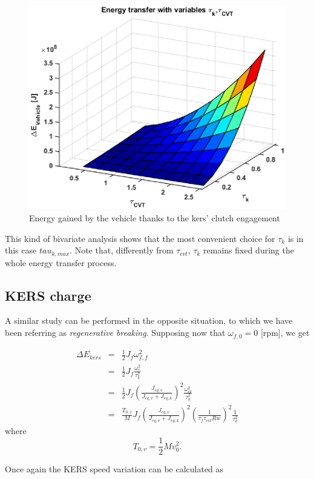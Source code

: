 \documentclass[11pt]{article}
\begin{document}
\begin{figure}[H]
\captionsetup{font=small, justification=centering}
\centering
\includegraphics[width=.55\textwidth]{Images/Results_new/Univariate_SteadyState/en_comp_acc_3D.eps}
\caption{Energy gained by the vehicle thanks to the kers' clutch engagement}
\label{en_comp_acc_3D}
\end{figure}    

This kind of bivariate analysis shows that the most convenient choice for $\tau_k$ is in this case $tau_{k,max}$. Note that, differently from $\tau_{cvt}$, $\tau_k$ remains fixed during the whole energy transfer process.

\subsection{KERS charge}

A similar study can be performed in the opposite situation, to which we have been referring as \textit{regenerative breaking}. Supposing now that $\omega_{f,0}=0$ [rpm], we get

\begin{eqnarray}
\Delta E_{kers}&=&\frac{1}{2}J_f\omega_{f,f}^2\\
               &=&\frac{1}{2}J_f\frac{\omega_{c}^2}{\tau_k^2}\\
               &=&\frac{1}{2}J_f\left(\frac{J_{eq,v}}{J_{eq,v}+J_{eq,k}}					          \right)^2\frac{\omega_{cv}^2}{\tau_k^2}\\               
               &=&\frac{T_{0,v}}{M}J_f\left(\frac{J_{eq,v}}{J_{eq,v}+J_{eq,k}}					     \right)^2\left(\frac{1}{\tau_f \tau_{cvt}Rw}\right)^2\frac{1}    						 {\tau_k^2} 
\end{eqnarray}
where
\begin{equation}
T_{0,v} = \frac{1}{2}Mv_0^2.
\end{equation} 

Once again the KERS speed variation can be calculated as 
\end{document}
